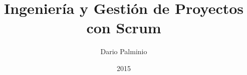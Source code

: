 
\title{\Huge 
    \textbf{Ingeniería y Gestión de Proyectos con Scrum}  \\ 
    \huge 
    }

\author{Dario Palminio}

\date{2015} 

\maketitle

